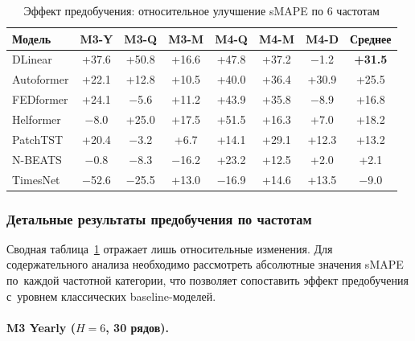 \begin{table}[H]
\centering
\caption{Эффект предобучения: относительное улучшение sMAPE по 6 частотам}
\label{tab:pretrain-all}
\small
\begin{tabular}{@{}lccccccc@{}}
\toprule
Модель & M3-Y & M3-Q & M3-M & M4-Q & M4-M & M4-D & Среднее \\
\midrule
DLinear & +37.6 & +50.8 & +16.6 & +47.8 & +37.2 & $-$1.2 & \textbf{+31.5} \\
Autoformer & +22.1 & +12.8 & +10.5 & +40.0 & +36.4 & +30.9 & +25.5 \\
FEDformer & +24.1 & $-$5.6 & +11.2 & +43.9 & +35.8 & $-$8.9 & +16.8 \\
Helformer & $-$8.0 & +25.0 & +17.5 & +51.5 & +16.3 & +7.0 & +18.2 \\
PatchTST & +20.4 & $-$3.2 & +6.7 & +14.1 & +29.1 & +12.3 & +13.2 \\
N-BEATS & $-$0.8 & $-$8.3 & $-$16.2 & +23.2 & +12.5 & +2.0 & +2.1 \\
TimesNet & $-$52.6 & $-$25.5 & +13.0 & $-$16.9 & +14.6 & +13.5 & $-$9.0 \\
\bottomrule
\end{tabular}
\end{table}

\subsubsection{Детальные результаты предобучения по частотам}

Сводная таблица~\ref{tab:pretrain-all} отражает лишь относительные
изменения. Для содержательного анализа необходимо рассмотреть
абсолютные значения sMAPE по~каждой частотной категории, что позволяет
сопоставить эффект предобучения с~уровнем классических baseline-моделей.

\paragraph{M3 Yearly ($H{=}6$, 30 рядов).}

